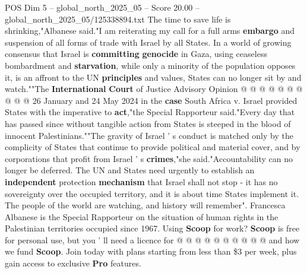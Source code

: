\begin{textsample}{POS Dim 5 – global\_north\_2025\_05 – Score 20.00 – global\_north\_2025\_05/125338894.txt}
The time to save life is shrinking,"Albanese said."I am reiterating my call for a full arms \textbf{embargo} and suspension of all forms of trade with Israel by all States.
In a world of growing consensus that Israel is \textbf{committing} \textbf{genocide} in Gaza, using ceaseless bombardment and \textbf{starvation}, while only a minority of the population opposes it, is an affront to the UN \textbf{principles} and values, States can no longer sit by and watch.""The \textbf{International} \textbf{Court} of Justice Advisory Opinion @ @ @ @ @ @ @ @ @ @ 26 January and 24 May 2024 in the \textbf{case} South Africa v.
Israel provided States with the imperative to \textbf{act},"the Special Rapporteur said."Every day that has passed since without tangible action from States is steeped in the blood of innocent Palestinians.""The gravity of Israel ' s conduct is matched only by the complicity of States that continue to provide political and material cover, and by corporations that profit from Israel ' s \textbf{crimes},"she said."Accountability can no longer be deferred.
The UN and States need urgently to establish an \textbf{independent} protection \textbf{mechanism} that Israel shall not stop - it has no sovereignty over the occupied territory, and it is about time States implement it.
The people of the world are watching, and history will remember".
Francesca Albanese is the Special Rapporteur on the situation of human rights in the Palestinian territories occupied since 1967.
Using \textbf{Scoop} for work? \textbf{Scoop} is free for personal use, but you ' ll need a licence for @ @ @ @ @ @ @ @ @ @ and how we fund \textbf{Scoop}.
Join today with plans starting from less than \$3 per week, plus gain access to exclusive \textbf{Pro} features.

\end{textsample}

